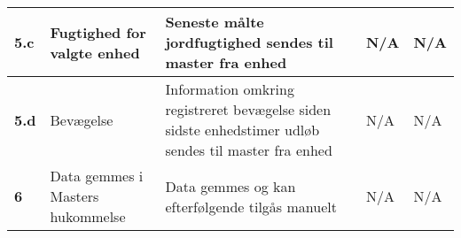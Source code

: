 \begin{center}
\begin{longtable}{|p{}|p{}|p{}|p{}|p{}|}
\textbf{5.c}	&Fugtighed for valgte enhed
			&Seneste målte jordfugtighed sendes til master fra enhed
			&N/A
			&N/A \\ \hline 
			
\textbf{5.d}	&Bevægelse
			&Information omkring registreret bevægelse siden sidste enhedstimer udløb sendes til master fra enhed
			&N/A
			&N/A \\ \hline 
			
\textbf{6}	&Data gemmes i Masters hukommelse
			&Data gemmes og kan efterfølgende tilgås manuelt
			&N/A
			&N/A \\ \hline 		
			
			
			
\end{longtable}
	\label{ATUC4} 
\end{center}
